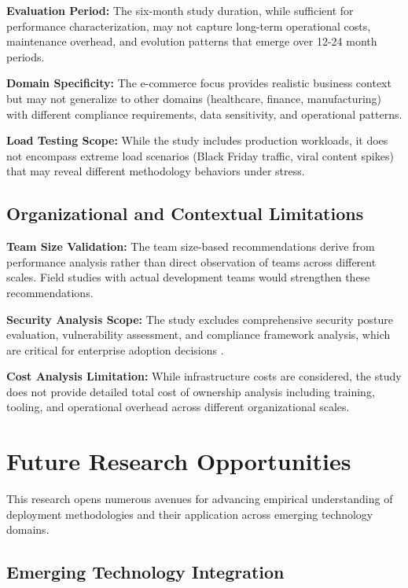 \textbf{Evaluation Period:} The six-month study duration, while sufficient for performance characterization, may not capture long-term operational costs, maintenance overhead, and evolution patterns that emerge over 12-24 month periods.

\textbf{Domain Specificity:} The e-commerce focus provides realistic business context but may not generalize to other domains (healthcare, finance, manufacturing) with different compliance requirements, data sensitivity, and operational patterns.

\textbf{Load Testing Scope:} While the study includes production workloads, it does not encompass extreme load scenarios (Black Friday traffic, viral content spikes) that may reveal different methodology behaviors under stress.

\subsection{Organizational and Contextual Limitations}
\label{subsec:organizational_limitations}

\textbf{Team Size Validation:} The team size-based recommendations derive from performance analysis rather than direct observation of teams across different scales. Field studies with actual development teams would strengthen these recommendations.

\textbf{Security Analysis Scope:} The study excludes comprehensive security posture evaluation, vulnerability assessment, and compliance framework analysis, which are critical for enterprise adoption decisions \cite{compliance_frameworks}.

\textbf{Cost Analysis Limitation:} While infrastructure costs are considered, the study does not provide detailed total cost of ownership analysis including training, tooling, and operational overhead across different organizational scales.

\section{Future Research Opportunities}
\label{sec:future_research}

This research opens numerous avenues for advancing empirical understanding of deployment methodologies and their application across emerging technology domains.

\subsection{Emerging Technology Integration}
\label{subsec:emerging_technology}

